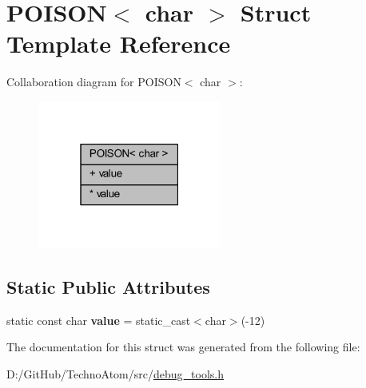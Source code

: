 \hypertarget{struct_p_o_i_s_o_n_3_01char_01_4}{}\section{P\+O\+I\+S\+ON$<$ char $>$ Struct Template Reference}
\label{struct_p_o_i_s_o_n_3_01char_01_4}


Collaboration diagram for P\+O\+I\+S\+ON$<$ char $>$\+:
\nopagebreak
\begin{figure}[H]
\begin{center}
\leavevmode
\includegraphics[width=171pt]{struct_p_o_i_s_o_n_3_01char_01_4__coll__graph}
\end{center}
\end{figure}
\subsection*{Static Public Attributes}
\textbf{ }\par
\begin{DoxyCompactItemize}
\item 
\mbox{\label{struct_p_o_i_s_o_n_3_01char_01_4_aa67110240ea4d4906071479b36c3f7e3}} 
static const char {\bfseries value} = static\+\_\+cast$<$char$>$(-\/12)
\end{DoxyCompactItemize}



The documentation for this struct was generated from the following file\+:\begin{DoxyCompactItemize}
\item 
D\+:/\+Git\+Hub/\+Techno\+Atom/src/\hyperlink{debug__tools_8h}{debug\+\_\+tools.\+h}\end{DoxyCompactItemize}
